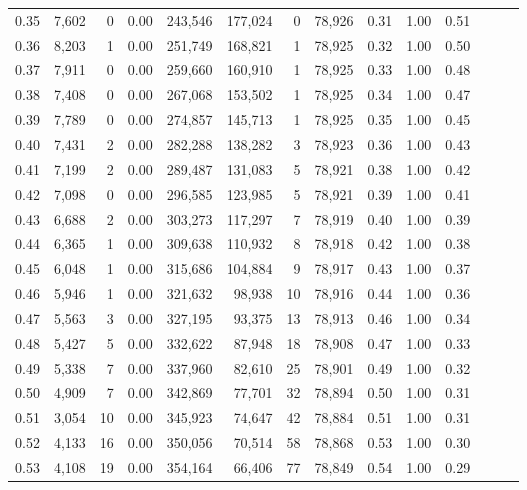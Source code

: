 \begin{tabular}{rrrrrrrrrrrrrr}
0.35 &  7,602 &      0 &  0.00 &  243,546 &  177,024 &       0 &  78,926 &  0.31 &  1.00 &      0.51 \\
0.36 &  8,203 &      1 &  0.00 &  251,749 &  168,821 &       1 &  78,925 &  0.32 &  1.00 &      0.50 \\
0.37 &  7,911 &      0 &  0.00 &  259,660 &  160,910 &       1 &  78,925 &  0.33 &  1.00 &      0.48 \\
0.38 &  7,408 &      0 &  0.00 &  267,068 &  153,502 &       1 &  78,925 &  0.34 &  1.00 &      0.47 \\
0.39 &  7,789 &      0 &  0.00 &  274,857 &  145,713 &       1 &  78,925 &  0.35 &  1.00 &      0.45 \\
0.40 &  7,431 &      2 &  0.00 &  282,288 &  138,282 &       3 &  78,923 &  0.36 &  1.00 &      0.43 \\
0.41 &  7,199 &      2 &  0.00 &  289,487 &  131,083 &       5 &  78,921 &  0.38 &  1.00 &      0.42 \\
0.42 &  7,098 &      0 &  0.00 &  296,585 &  123,985 &       5 &  78,921 &  0.39 &  1.00 &      0.41 \\
0.43 &  6,688 &      2 &  0.00 &  303,273 &  117,297 &       7 &  78,919 &  0.40 &  1.00 &      0.39 \\
0.44 &  6,365 &      1 &  0.00 &  309,638 &  110,932 &       8 &  78,918 &  0.42 &  1.00 &      0.38 \\
0.45 &  6,048 &      1 &  0.00 &  315,686 &  104,884 &       9 &  78,917 &  0.43 &  1.00 &      0.37 \\
0.46 &  5,946 &      1 &  0.00 &  321,632 &   98,938 &      10 &  78,916 &  0.44 &  1.00 &      0.36 \\
0.47 &  5,563 &      3 &  0.00 &  327,195 &   93,375 &      13 &  78,913 &  0.46 &  1.00 &      0.34 \\
0.48 &  5,427 &      5 &  0.00 &  332,622 &   87,948 &      18 &  78,908 &  0.47 &  1.00 &      0.33 \\
0.49 &  5,338 &      7 &  0.00 &  337,960 &   82,610 &      25 &  78,901 &  0.49 &  1.00 &      0.32 \\
0.50 &  4,909 &      7 &  0.00 &  342,869 &   77,701 &      32 &  78,894 &  0.50 &  1.00 &      0.31 \\
0.51 &  3,054 &     10 &  0.00 &  345,923 &   74,647 &      42 &  78,884 &  0.51 &  1.00 &      0.31 \\
0.52 &  4,133 &     16 &  0.00 &  350,056 &   70,514 &      58 &  78,868 &  0.53 &  1.00 &      0.30 \\
0.53 &  4,108 &     19 &  0.00 &  354,164 &   66,406 &      77 &  78,849 &  0.54 &  1.00 &      0.29 \\

\end{tabular}
